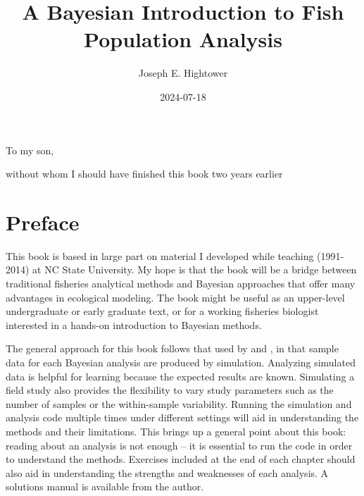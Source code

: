 \documentclass[
]{krantz}
\title{A Bayesian Introduction to Fish Population Analysis}
\author{Joseph E. Hightower}
\date{2024-07-18}
\begin{document}
\maketitle


\thispagestyle{empty}

\begin{center}
To my son,

without whom I should have finished this book two years earlier
\end{center}

\setlength{\abovedisplayskip}{-5pt}
\setlength{\abovedisplayshortskip}{-5pt}

{
\hypersetup{linkcolor=}
\setcounter{tocdepth}{2}
\tableofcontents
}
\listoffigures
\listoftables
\hypertarget{preface}{%
\chapter*{Preface}\label{preface}}


This book is based in large part on material I developed while teaching (1991-2014) at NC State University. My hope is that the book will be a bridge between traditional fisheries analytical methods and Bayesian approaches that offer many advantages in ecological modeling. The book might be useful as an upper-level undergraduate or early graduate text, or for a working fisheries biologist interested in a hands-on introduction to Bayesian methods.

The general approach for this book follows that used by \citet{kéry_2010} and \citet{kéry.schaub_2011}, in that sample data for each Bayesian analysis are produced by simulation. Analyzing simulated data is helpful for learning because the expected results are known. Simulating a field study also provides the flexibility to vary study parameters such as the number of samples or the within-sample variability. Running the simulation and analysis code multiple times under different settings will aid in understanding the methods and their limitations. This brings up a general point about this book: reading about an analysis is not enough -- it is essential to run the code in order to understand the methods. Exercises included at the end of each chapter should also aid in understanding the strengths and weaknesses of each analysis. A solutions manual is available from the author.
\end{document}
